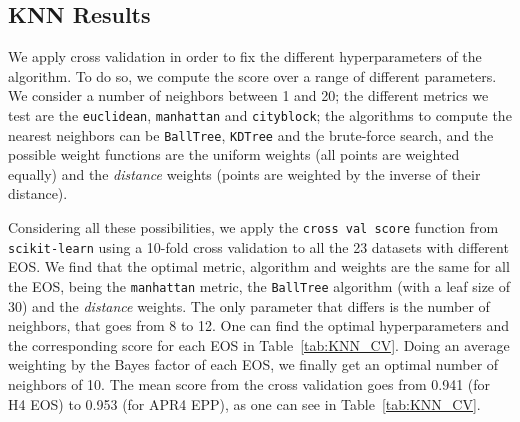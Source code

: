\subsection{KNN Results}



We apply cross validation in order to fix the different hyperparameters of the algorithm.  To do so, we compute the score over a range of different parameters. We consider a number of neighbors between 1 and 20; the different metrics we test are the \texttt{euclidean}, \texttt{manhattan} and \texttt{cityblock}; the algorithms to compute the nearest neighbors can be \texttt{BallTree}, \texttt{KDTree} and the brute-force search, and the possible weight functions are the uniform weights (all points are weighted equally) and the \textit{distance} weights (points are weighted by the inverse of their distance). 

Considering all these possibilities, we apply the \texttt{cross val score} function from \texttt{scikit-learn} using a 10-fold cross validation to all the 23 datasets with different EOS.  We find that the optimal metric, algorithm and weights are the same for all the EOS, being the  \texttt{manhattan} metric, the \texttt{BallTree} algorithm (with a leaf size of 30) and the \textit{distance} weights. The only parameter that differs is the number of neighbors, that goes from 8 to 12. One can find the optimal hyperparameters and the corresponding score for each EOS in Table~\ref{tab:KNN_CV}. Doing an average weighting by the Bayes factor of each EOS, we finally get an optimal number of neighbors of 10. The mean score from the cross validation goes from 0.941 (for H4 EOS) to 0.953 (for APR4 EPP), as one can see in Table~\ref{tab:KNN_CV}.  

